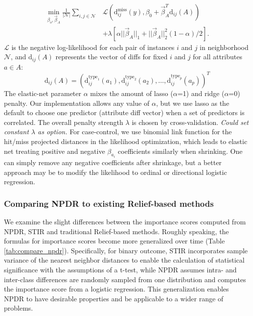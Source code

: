 \documentclass[10pt]{article}
\begin{document}
\begin{equation}\label{eq:glmnetNPDR}
\begin{aligned}
    \min_{\beta_o, \vec{\beta}_A} \frac{1}{|\mathcal{N}|}  \sum_{i,j \in \mathcal{N}} & 
           \mathcal{L} \left(\text{d}^{\text{miss}}_{ij}(y), \beta_0 + \vec{\beta}_A^{T} \text{d}_{ij}(A) \right)
     \\ \nonumber
     & + \lambda \left[ \alpha || \vec{\beta}_A ||_1 + || \vec{\beta}_A ||_2^2 (1-\alpha)/2  \right].
\end{aligned}
\end{equation}
$\mathcal{L}$ is the negative log-likelihood for each pair of instances $i$ and $j$ in neighborhood $\mathcal{N}$, and $\text{d}_{ij}(A)$ represents the vector of diffs for fixed $i$ and $j$ for all attributes $a \in A$: 
\begin{equation}
\text{d}_{ij}(A)= \left( \text{d}^{\text{type}_1}_{ij}(a_1), \text{d}^{\text{type}_2}_{ij}(a_2), \ldots, \text{d}^{\text{type}_p}_{ij}(a_p) \right)^{T}
\end{equation}
The elastic-net parameter $\alpha$ mixes the amount of lasso ($\alpha$=1) and ridge ($\alpha$=0) penalty. Our implementation allows any value of $\alpha$, but we use lasso as the default to choose one predictor (attribute diff vector) when a set of predictors is correlated. The overall penalty strength $\lambda$ is chosen by cross-validation.  {\it Could set constant $\lambda$ as option.} For case-control, we use binomial link function for the hit/miss projected distances in the likelihood optimization, which leads to elastic net treating positive and negative $\beta_{a_i}$ coefficients similarly when shrinking. One can simply remove any negative coefficients after shrinkage, but a better approach may be to modify the likelihood to ordinal or directional logistic regression.   

\subsubsection{Comparing NPDR to existing Relief-based methods}
We examine the slight differences between the importance scores computed from NPDR, STIR and traditional Relief-based methods.
Roughly speaking, the formulas for importance scores become more generalized over time (Table \ref{tab:compare_npdr}).
Specifically, for binary outcome, STIR incorporates sample variance of the nearest neighbor distances to enable the calculation of statistical significance with the assumptions of a t-test, while NPDR assumes intra- and inter-class differences are randomly sampled from one distribution and computes the importance score from a logistic regression. This generalization enables NPDR to have desirable properties and be applicable to a wider range of problems.
\end{document}
